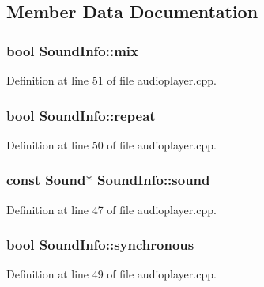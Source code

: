 \subsection{Member Data Documentation}
\hypertarget{classSoundInfo_a278bfffef8d5df5ecd17b6ea0b5927e1}{
\subsubsection[{mix}]{\setlength{\rightskip}{0pt plus 5cm}bool Sound\+Info\+::mix}}\label{classSoundInfo_a278bfffef8d5df5ecd17b6ea0b5927e1}


Definition at line 51 of file audioplayer.\+cpp.

\hypertarget{classSoundInfo_a659c959da1310b4cfb1705b11b62a15f}{
\subsubsection[{repeat}]{\setlength{\rightskip}{0pt plus 5cm}bool Sound\+Info\+::repeat}}\label{classSoundInfo_a659c959da1310b4cfb1705b11b62a15f}


Definition at line 50 of file audioplayer.\+cpp.

\hypertarget{classSoundInfo_a2cacccbf3b0833dcef00458a098dfcc8}{
\subsubsection[{sound}]{\setlength{\rightskip}{0pt plus 5cm}const {\bf Sound}$\ast$ Sound\+Info\+::sound}}\label{classSoundInfo_a2cacccbf3b0833dcef00458a098dfcc8}


Definition at line 47 of file audioplayer.\+cpp.

\hypertarget{classSoundInfo_a1e3333e1e160a58e922610c3121a1114}{
\subsubsection[{synchronous}]{\setlength{\rightskip}{0pt plus 5cm}bool Sound\+Info\+::synchronous}}\label{classSoundInfo_a1e3333e1e160a58e922610c3121a1114}


Definition at line 49 of file audioplayer.\+cpp.

